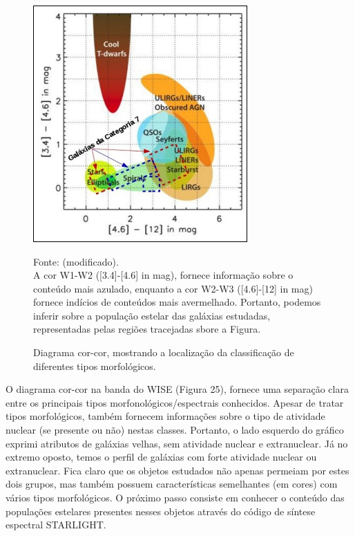 \begin{figure}[H]
	\centering	
    \caption{Diagrama cor-cor, mostrando a localização da classificação de diferentes tipos morfológicos.}
    \includegraphics[width=0.73\textwidth]{figuras/coresm.jpg}
   	\begin{center}
        \normalsize Fonte:  (modificado).\\A cor W1-W2 ([3.4]-[4.6] in mag), fornece informação sobre o conteúdo mais azulado, enquanto a cor W2-W3 ([4.6]-[12] in mag) fornece indícios de conteúdos mais avermelhado. Portanto, podemos inferir sobre a população estelar das galáxias estudadas, representadas pelas regiões tracejadas sbore a Figura.
    \end{center}
	\label{fig:sbmt-moses}
\end{figure}

O diagrama cor-cor na banda do WISE (Figura 25), fornece uma separação clara entre os principais tipos morfonológicos/espectrais conhecidos. Apesar de tratar tipos morfológicos, também fornecem informações sobre o tipo de atividade nuclear (se presente ou não) nestas classes. Portanto, o lado esquerdo do gráfico exprimi atributos de galáxias velhas, sem atividade nuclear e extranuclear. Já no extremo oposto, temos o perfil
de galáxias com forte atividade nuclear ou extranuclear. Fica claro que os objetos estudados não apenas permeiam por estes dois grupos, mas também possuem características semelhantes (em cores) com vários tipos morfológicos. O próximo passo consiste em conhecer o conteúdo das populações estelares presentes nesses objetos através do código de síntese espectral STARLIGHT.

